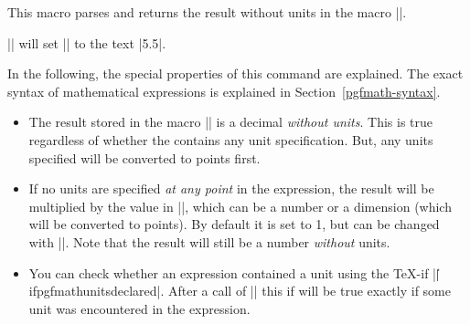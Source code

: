 \begin{command}{\pgfmathparse{}}
  This macro parses  and returns the result without
  units in  the macro |\pgfmathresult|.

  \example |\pgfmathparse{2pt+3.5pt}| will set |\pgfmathresult| to the
  text |5.5|.

  In the following, the special properties of this command are
  explained. The exact syntax of mathematical expressions is explained
  in Section~\ref{pgfmath-syntax}.

  \begin{itemize}
  \item
    The result stored in the macro |\pgfmathresult| is a decimal
    \emph{without units}. This is true regardless of whether the
     contains any unit specification. But, any units
    specified will be converted to points first.
\begin{codeexample}[]
\pgfmathparse{2pt+3.4pt} \pgfmathresult
\end{codeexample}

\begin{codeexample}[]
\pgfmathparse{2cm+3.4cm} \pgfmathresult
\end{codeexample}

  \item If no units are specified \emph{at any point} in the 
    expression, the result will be multiplied by the value in 
    |\pgfmathresultunitscale|, which can be a number or a dimension 
    (which will be converted to points). By default it is set to 1, 
    but can be changed with |\pgfmathsetresultunitscale|. Note that 
    the result will still be a number \emph{without} units.

\begin{codeexample}[]
\pgfmathparse{2pt+3.4pt} \pgfmathresult
\end{codeexample}

\begin{codeexample}[]
\pgfmathsetresultunitscale{1cm}
 \pgfmathresult
\end{codeexample}

    \pgfmathsetresultunitscale{1pt}
    
  \item You can check whether an expression contained a unit using 
    the \TeX-if |\||ifpgfmathunitsdeclared|. After a call
    of |\pgfmathparse| this if will be true exactly if some unit was
    encountered in the expression.
    

\end{itemize}
\end{command}
